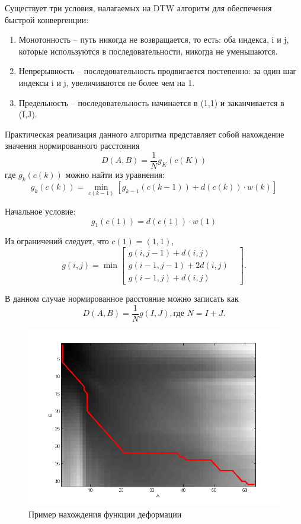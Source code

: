 \documentclass[14pt,russian,utf8,nocolumnsxix]{extarticle}
\begin{document}
Существует три условия, налагаемых на DTW алгоритм для обеспечения быстрой конвергенции:

\begin{enumerate}
 \item Монотонность – путь никогда не возвращается, то есть: оба индекса, i и j, которые используются в последовательности, никогда не уменьшаются. 

 \item Непрерывность – последовательность продвигается постепенно: за один шаг индексы i и j, увеличиваются не более чем на 1.

 \item Предельность – последовательность начинается в (1,1) и заканчивается в (I,J).
 \end{enumerate}

Практическая реализация данного алгоритма представляет собой нахождение значения нормированного расстояния
\[
D(A,B)=\frac{1}{N}g_{K}(c(K))
\]
где $g_{k}(c(k))$ можно найти из уравнения:
\[
g_{k}(c(k))=\min_{c(k-1)}[g_{k-1}(c(k-1))+d(c(k))\cdot w(k)]
\]

Начальное условие:
\[
g_{1}(c(1))=d(c(1))\cdot w(1)
\]

Из ограничений следует, что $c(1)=(1,1)$,
\[
g(i,j)=\min \left[ \begin{matrix} g(i,j-1)+d(i,j) & \\ g(i-1,j-1)+2d(i,j) &\\ g(i-1,j)+d(i,j) &\end{matrix} \right].
\]

В данном случае нормированное расстояние можно записать как
\[
D(A,B)=\frac{1}{N}g(I,J), \text{где } N=I+J.
\]
\begin{figure}[H]	
	\centering
	\includegraphics[width=120mm]{d_matrix.png}			
	\caption{Пример нахождения функции деформации}
	\label{d_matrix1}
\end{figure}
\end{document}
